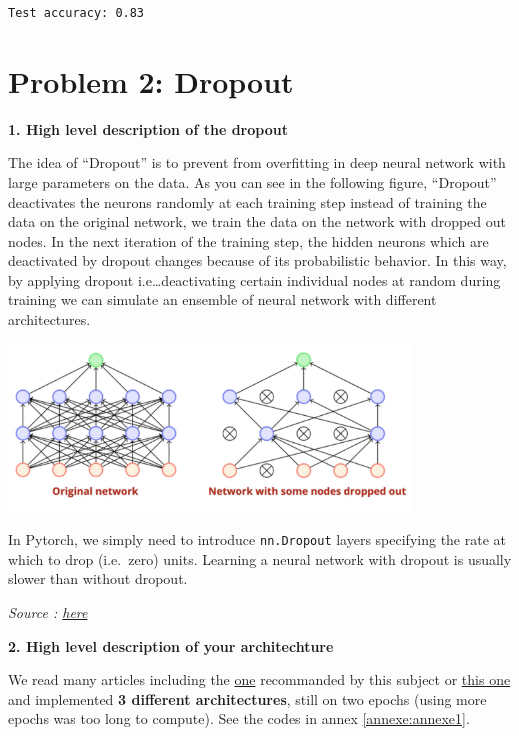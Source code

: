 \documentclass[10pt,a4paper]{article}
\theoremstyle{break}
\begin{document}
\begin{verbatim}
Test accuracy: 0.83
\end{verbatim}

\hypertarget{problem-2-dropout}{%
\section{Problem 2: Dropout}\label{problem-2-dropout}}

\textbf{1. High level description of the dropout}

The idea of ``Dropout'' is to prevent from overfitting in deep neural network with large parameters on the data. As you can see in the following figure, ``Dropout'' deactivates the neurons randomly at each training step instead of training the data on the original network, we train the data on the network with dropped out nodes. In the next iteration of the training step, the hidden neurons which are deactivated by dropout changes because of its probabilistic behavior. In this way, by applying dropout i.e\ldots{}deactivating certain individual nodes at random during training we can simulate an ensemble of neural network with different architectures.

\begin{center}
\includegraphics[width=0.8\textwidth]{img/1S-Rr9boTfKusUzETeKW6Mg.png}
\end{center}

In Pytorch, we simply need to introduce \texttt{nn.Dropout} layers specifying the rate at which to drop (i.e.~zero) units. Learning a neural network with dropout is usually slower than without dropout.

\emph{Source : \href{https://towardsdatascience.com/batch-normalization-and-dropout-in-neural-networks-explained-with-pytorch-47d7a8459bcd}{here}}

\textbf{2. High level description of your architechture}

We read many articles including the \href{https://www.kaggle.com/c/digit-recognizer/discussion/61480}{one} recommanded by this subject or \href{https://github.com/jeremyfix/deeplearning-lectures/blob/master/LabsSolutions/00-pytorch-FashionMNIST/models.py}{this one} and implemented \textbf{3 different architectures}, still on two epochs (using more epochs was too long to compute). See the codes in annex \ref{annexe:annexe1}.
\end{document}

